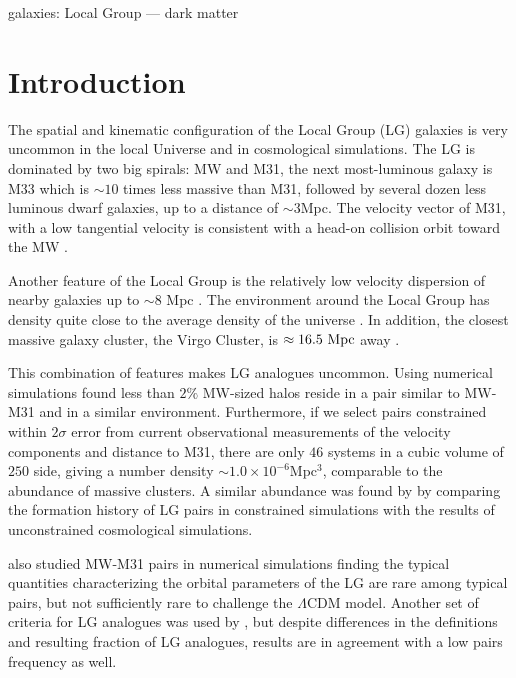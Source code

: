 \documentclass{emulateapj}
\newcommand{\lcdm}{$\Lambda$CDM }
\newcommand{\mpc}{\rm{Mpc}}
\newcommand{\hmpc}{{\ifmmode{h^{-1}{\rm Mpc}}\else{$h^{-1}$Mpc }\fi}}
\begin{document}
\begin{keywords}
{galaxies: Local Group --- dark matter}
\end{keywords}


\section{Introduction}
\label{sec:intro}


The spatial and kinematic configuration of the Local Group
(LG) galaxies is very uncommon in the local Universe and in cosmological
simulations. 
The LG is dominated by two big spirals: MW and M31, the next
most-luminous galaxy is M33 which is $\sim 10$ times less massive than
M31, followed by several dozen less luminous dwarf galaxies, up to a
distance of $\sim 3$\mpc.   
The velocity vector of M31, with a low
tangential velocity is consistent with a head-on collision orbit toward
the MW
\citep{2008MNRAS.386..461C,2012ApJ...753....8V,2012ApJ...753....7S}.   

Another feature of the Local Group is the relatively low velocity
dispersion of nearby galaxies up to $\sim 8$ Mpc \citep[][and
  references therein]{1975ApJ...196..313S,2011MNRAS.415L..16A}. 
The environment around the Local Group has density quite close to the
average density of the universe
\citep{2003ApJ...596...19K,2005AJ....129..178K}. 
In addition, the closest massive galaxy cluster, the Virgo Cluster, is
$\approx 16.5\ \mpc$ away \citep{2007ApJ...655..144M}.   

This combination of features makes LG analogues uncommon. 
Using numerical simulations \citet{lganalogues} found less than
$2\%$ MW-sized halos reside in a pair similar to MW-M31 and in a
similar environment. 
Furthermore, if we select pairs constrained
within $2\sigma$ error from current observational measurements of the
velocity components and distance to M31, there are only $46$ systems
in a cubic volume of $250$ \hmpc side, giving a number density $\sim
1.0\times 10^{-6}$Mpc$^{3}$, comparable to the abundance of massive
clusters. 
A similar abundance was found by \cite{ForeroRomero2011} by comparing the
formation history of LG pairs in constrained simulations with the
results of unconstrained cosmological simulations.

\citet{2013ApJ...767L...5F} also studied MW-M31 pairs in numerical
simulations finding the typical quantities characterizing the orbital
parameters of the LG are rare among typical pairs, but not sufficiently rare to
challenge the \lcdm model.  
Another set of criteria for LG analogues was used
by \citet{2008MNRAS.384.1459L}, but despite differences in the
definitions and resulting fraction of LG analogues, results are in
agreement with a low pairs frequency as well.  
\end{document}
